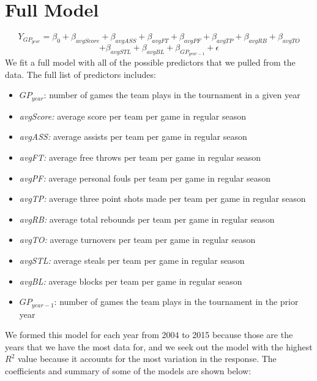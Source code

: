 \documentclass[]{scrartcl}
\begin{document}
\section*{Full Model}
	\[
Y_{GP_{year}} = \beta_0 + \beta_{avgScore} + \beta_{avgASS} +\beta_{avgFT} + \beta_{avgPF} + \beta_{avgTP} + \beta_{avgRB} + \beta_{avgTO}
\] 
\[
+ \beta_{avgSTL} +\beta_{avgBL} + \beta_{GP_{year-1}}+ \epsilon
\]
We fit a full model with all of the possible predictors that we pulled from the data. The full list of predictors includes:
	\begin{itemize}
	\item 	{$GP_{year}$:} number of games the team plays in the tournament in a given year
	\item 	{\textit{avgScore:}} average score per team per game in regular season
	\item 	{\textit{avgASS:}} average assists per team per game in regular season
	\item 	{\textit{avgFT:}} average free throws per team per game in regular season
	\item 	{\textit{avgPF:}} average personal fouls per team per game in regular season
	\item 	{\textit{avgTP:}} average three point shots made per team per game in regular season
	\item 	{\textit{avgRB:}} average total rebounds per team per game in regular season
	\item 	{\textit{avgTO:}} average turnovers per team per game in regular season
	\item 	{\textit{avgSTL:}} average steals per team per game in regular season
	\item 	{\textit{avgBL:}} average blocks per team per game in regular season
	\item 	{$GP_{year-1}$:} number of games the team plays in the tournament in the prior year
	\end{itemize}
We formed this model for each year from 2004 to 2015 because those are the years that we have the most data for, and we seek out the model with the highest $R^{2}$ value because it accounts for the most variation in the response. The coefficients and summary of some of the models are shown below:
\footnotesize
\end{document}
